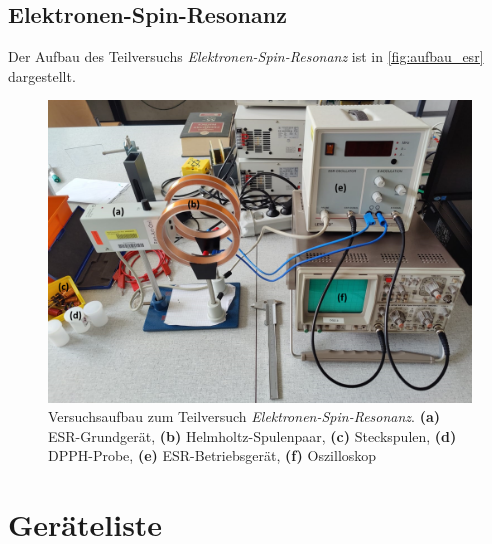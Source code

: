 \documentclass[ngerman]{scrartcl}
\begin{document}
\subsection{Elektronen-Spin-Resonanz}
\label{subsec:anordnung_esr}

Der Aufbau des Teilversuchs \textit{Elektronen-Spin-Resonanz} ist in \autoref{fig:aufbau_esr} dargestellt.
%
\begin{figure}[H]
    \centering
    \begin{samepage}
        \includegraphics[width=0.8\linewidth]{fig/ESR_Aufbau_bearbeitet.png}
        \caption[Aufbau Elektronen-Spin-Resonanz]{Versuchsaufbau zum Teilversuch \textit{Elektronen-Spin-Resonanz}. \textbf{(a)} ESR-Grundgerät, \textbf{(b)} Helmholtz-Spulenpaar, \textbf{(c)} Steckspulen, \textbf{(d)} DPPH-Probe, \textbf{(e)} ESR-Betriebsgerät, \textbf{(f)} Oszilloskop}
        \label{fig:aufbau_esr}
    \end{samepage}
\end{figure}



\section{Geräteliste}
\label{sec:geraeteliste}
\end{document}
